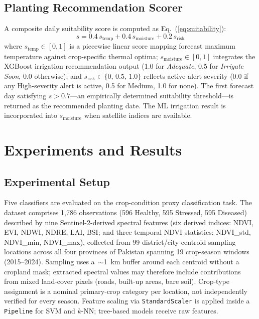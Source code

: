 \documentclass[conference]{IEEEtran}
\begin{document}
\subsection{Planting Recommendation Scorer}

A composite daily suitability score is computed as Eq.~(\ref{eq:suitability}):
\begin{equation}
  s = 0.4\,s_{\text{temp}} + 0.4\,s_{\text{moisture}} + 0.2\,s_{\text{risk}}
  \label{eq:suitability}
\end{equation}
where $s_{\text{temp}} \in [0,1]$ is a piecewise linear score mapping forecast
maximum temperature against crop-specific thermal optima;
$s_{\text{moisture}} \in [0,1]$ integrates the XGBoost irrigation
recommendation output (1.0 for \textit{Adequate}, 0.5 for \textit{Irrigate
Soon}, 0.0 otherwise); and $s_{\text{risk}} \in \{0,\,0.5,\,1.0\}$ reflects
active alert severity (0.0 if any High-severity alert is active, 0.5 for
Medium, 1.0 for none). The first forecast day satisfying $s > 0.7$---an
empirically determined suitability threshold---is returned as the recommended
planting date. The ML irrigation result is incorporated into
$s_{\text{moisture}}$ when satellite indices are available.

\section{Experiments and Results}
\label{sec:experiments}

\subsection{Experimental Setup}

Five classifiers are evaluated on the crop-condition proxy classification task.
The dataset comprises 1,786 observations (596 Healthy, 595 Stressed, 595 Diseased)
described by nine Sentinel-2-derived spectral features (six derived indices:
NDVI, EVI, NDWI, NDRE, LAI, BSI; and three temporal NDVI statistics:
NDVI\_std, NDVI\_min, NDVI\_max), collected from 99 district/city-centroid
sampling locations across all four provinces of Pakistan spanning 19 crop-season
windows (2015--2024). Sampling uses a~$\sim$1~km buffer around each centroid
without a cropland mask; extracted spectral values may therefore include
contributions from mixed land-cover pixels (roads, built-up areas, bare soil).
Crop-type assignment is a nominal primary-crop category per location, not
independently verified for every season. Feature scaling via
\texttt{StandardScaler} is applied inside a \texttt{Pipeline} for SVM and
$k$-NN; tree-based models receive raw features.
\end{document}
